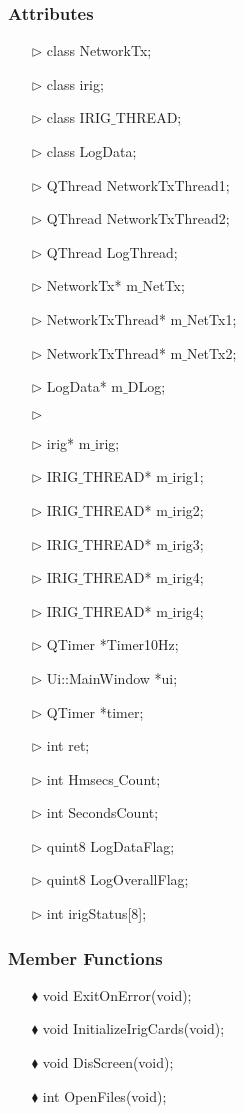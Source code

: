 \subsubsection{Attributes}
\begin{enumerate}
\item [$\rhd$] class NetworkTx;
\item [$\rhd$] class irig;
\item [$\rhd$] class IRIG$\_$THREAD;
\item [$\rhd$] class LogData;
\item [$\rhd$]QThread NetworkTxThread1;
\item [$\rhd$]QThread NetworkTxThread2;
\item [$\rhd$]QThread LogThread;
\item [$\rhd$]NetworkTx* m$\_$NetTx;
\item [$\rhd$] NetworkTxThread* m$\_$NetTx1;
\item [$\rhd$] NetworkTxThread* m$\_$NetTx2;
\item [$\rhd$] LogData* m$\_$DLog;
\item [$\rhd$] 
\item [$\rhd$] irig* m$\_$irig;
\item [$\rhd$] IRIG$\_$THREAD* m$\_$irig1;
\item [$\rhd$] IRIG$\_$THREAD* m$\_$irig2;
\item [$\rhd$] IRIG$\_$THREAD* m$\_$irig3;
\item [$\rhd$] IRIG$\_$THREAD* m$\_$irig4;
\item [$\rhd$] IRIG$\_$THREAD* m$\_$irig4;
\item [$\rhd$] QTimer *Timer10Hz;
\item [$\rhd$] Ui::MainWindow *ui;
\item [$\rhd$] QTimer *timer;
\item [$\rhd$] int ret;
\item [$\rhd$] int Hmsecs$\_$Count;
\item [$\rhd$] int SecondsCount;
\item [$\rhd$] quint8 LogDataFlag;
\item [$\rhd$] quint8 LogOverallFlag;
\item [$\rhd$] int irigStatus[8];

\end{enumerate}

\subsubsection{Member Functions }
\begin{enumerate}
	\item [$\blacklozenge$] void ExitOnError(void);
	\item [$\blacklozenge$] void InitializeIrigCards(void);
	\item [$\blacklozenge$] void DisScreen(void);
	\item [$\blacklozenge$] int  OpenFiles(void);
	
\end{enumerate}

